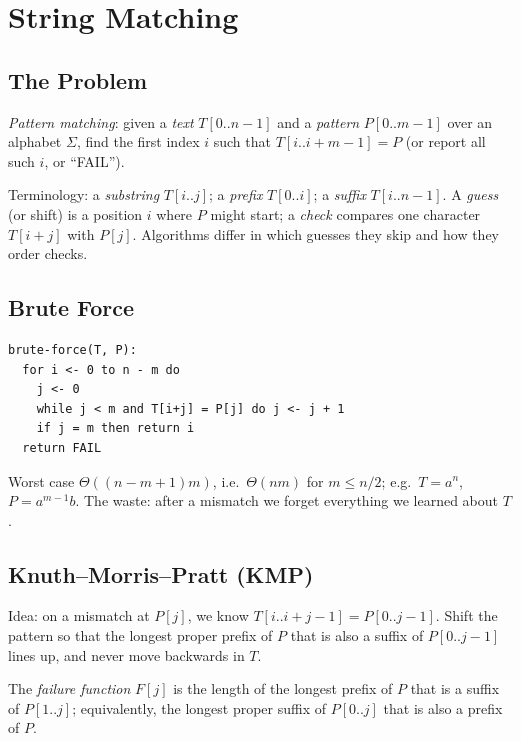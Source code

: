 \chapter{String Matching}

\section{The Problem}

\begin{definition}
\emph{Pattern matching}: given a \emph{text} $T[0..n-1]$ and a \emph{pattern}
$P[0..m-1]$ over an alphabet $\Sigma$, find the first index $i$ such that
$T[i..i+m-1] = P$ (or report all such $i$, or ``FAIL'').
\end{definition}

Terminology: a \emph{substring} $T[i..j]$; a \emph{prefix} $T[0..i]$; a
\emph{suffix} $T[i..n-1]$. A \emph{guess} (or shift) is a position $i$ where $P$
might start; a \emph{check} compares one character $T[i+j]$ with $P[j]$.
Algorithms differ in which guesses they skip and how they order checks.

\section{Brute Force}

\begin{lstlisting}
brute-force(T, P):
  for i <- 0 to n - m do
    j <- 0
    while j < m and T[i+j] = P[j] do j <- j + 1
    if j = m then return i
  return FAIL
\end{lstlisting}
Worst case $\Theta((n - m + 1) m)$, i.e.\ $\Theta(nm)$ for $m \le n/2$; e.g.\
$T = a^n$, $P = a^{m-1}b$. The waste: after a mismatch we forget everything we
learned about $T$.

\section{Knuth--Morris--Pratt (KMP)}

Idea: on a mismatch at $P[j]$, we know $T[i..i+j-1] = P[0..j-1]$. Shift the
pattern so that the longest proper prefix of $P$ that is also a suffix of
$P[0..j-1]$ lines up, and never move backwards in $T$.

\begin{definition}
The \emph{failure function} $F[j]$ is the length of the longest prefix of $P$
that is a suffix of $P[1..j]$; equivalently, the longest proper suffix of
$P[0..j]$ that is also a prefix of $P$.
\end{definition}


